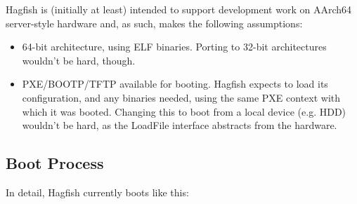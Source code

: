 \documentclass[a4paper,twoside]{report}
\begin{document}
Hagfish is (initially at least) intended to support development work on
AArch64 server-style hardware and, as such, makes the following assumptions:

\begin{itemize}
\item 64-bit architecture, using ELF binaries. Porting to 32-bit architectures
wouldn't be hard, though.
\item PXE/BOOTP/TFTP available for booting. Hagfish expects to load its
configuration, and any binaries needed, using the same PXE context with which
it was booted. Changing this to boot from a local device (e.g. HDD) wouldn't
be hard, as the LoadFile interface abstracts from the hardware.
\end{itemize}

\subsection{Boot Process}

In detail, Hagfish currently boots like this:
\end{document}
